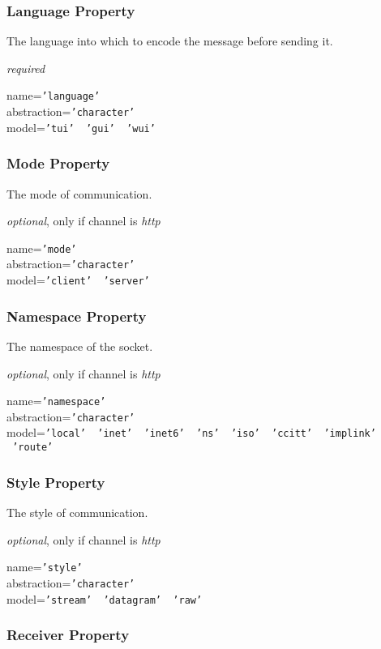 \subsubsection{Language Property}

The language into which to encode the message before sending it.

\emph{required}

name=\texttt{'language'}\\
abstraction=\texttt{'character'}\\
model=\texttt{'tui' \vline\ 'gui' \vline\ 'wui'}

\subsubsection{Mode Property}

The mode of communication.

\emph{optional}, only if channel is \emph{http}

name=\texttt{'mode'}\\
abstraction=\texttt{'character'}\\
model=\texttt{'client' \vline\ 'server'}

\subsubsection{Namespace Property}

The namespace of the socket.

\emph{optional}, only if channel is \emph{http}

name=\texttt{'namespace'}\\
abstraction=\texttt{'character'}\\
model=\texttt{'local' \vline\ 'inet' \vline\ 'inet6' \vline\ 'ns' \vline\ 'iso' \vline\ 'ccitt' \vline\ 'implink' \vline\ 'route'}

\subsubsection{Style Property}

The style of communication.

\emph{optional}, only if channel is \emph{http}

name=\texttt{'style'}\\
abstraction=\texttt{'character'}\\
model=\texttt{'stream' \vline\ 'datagram' \vline\ 'raw'}

\subsubsection{Receiver Property}

